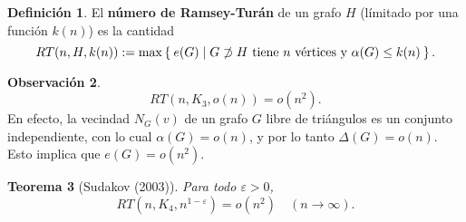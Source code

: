 \documentclass[12pt]{report}
\theoremstyle{plain}
\newtheorem{theorem}{Teorema}[section]
\theoremstyle{definition}
\newtheorem{definition}[theorem]{Definición}
\newtheorem{obs}[theorem]{Observación}
\begin{document}
\begin{definition}
El \textbf{número de Ramsey-Turán} de un grafo $H$ (límitado por una función $k(n)$) es la cantidad
\[
RT (n, H, k(n)) := \max \Set{e(G) | G \not \supset H \text{ tiene $n$ vértices y } \alpha (G) \leq k(n)}.
\]
\end{definition}

\begin{obs}
\[
    RT (n, K_3, o (n)) = o(n^2).
\]
En efecto, la vecindad $N_G (v)$ de un grafo $G$ libre de triángulos es un conjunto independiente, con lo cual $\alpha (G) = o (n)$, y por lo tanto $\Delta (G) = o (n)$. Esto implica que $e(G) = o (n^2)$.
\end{obs}

\begin{theorem}[Sudakov (2003)]
Para todo $\varepsilon > 0$,
\[
    RT (n, K_4, n^{1-\varepsilon}) = o (n^2) \quad (n \to \infty).
\]

\end{theorem}
\end{document}
